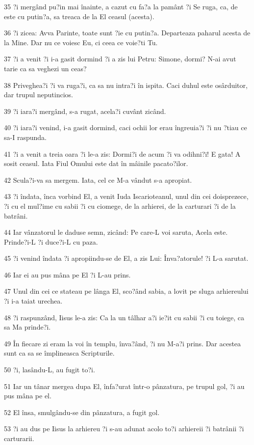 \par 35 ?i mergând pu?in mai înainte, a cazut cu fa?a la pamânt ?i Se ruga, ca, de este cu putin?a, sa treaca de la El ceasul (acesta).
\par 36 ?i zicea: Avva Parinte, toate sunt ?ie cu putin?a. Departeaza paharul acesta de la Mine. Dar nu ce voiesc Eu, ci ceea ce voie?ti Tu.
\par 37 ?i a venit ?i i-a gasit dormind ?i a zis lui Petru: Simone, dormi? N-ai avut tarie ca sa veghezi un ceas?
\par 38 Priveghea?i ?i va ruga?i, ca sa nu intra?i în ispita. Caci duhul este osârduitor, dar trupul neputincios.
\par 39 ?i iara?i mergând, s-a rugat, acela?i cuvânt zicând.
\par 40 ?i iara?i venind, i-a gasit dormind, caci ochii lor erau îngreuia?i ?i nu ?tiau ce sa-I raspunda.
\par 41 ?i a venit a treia oara ?i le-a zis: Dormi?i de acum ?i va odihni?i! E gata! A sosit ceasul. Iata Fiul Omului este dat în mâinile pacato?ilor.
\par 42 Scula?i-va sa mergem. Iata, cel ce M-a vândut s-a apropiat.
\par 43 ?i îndata, înca vorbind El, a venit Iuda Iscarioteanul, unul din cei doisprezece, ?i cu el mul?ime cu sabii ?i cu ciomege, de la arhierei, de la carturari ?i de la batrâni.
\par 44 Iar vânzatorul le daduse semn, zicând: Pe care-L voi saruta, Acela este. Prinde?i-L ?i duce?i-L cu paza.
\par 45 ?i venind îndata ?i apropiindu-se de El, a zis Lui: Înva?atorule! ?i L-a sarutat.
\par 46 Iar ei au pus mâna pe El ?i L-au prins.
\par 47 Unul din cei ce stateau pe lânga El, sco?ând sabia, a lovit pe sluga arhiereului ?i i-a taiat urechea.
\par 48 ?i raspunzând, Iisus le-a zis: Ca la un tâlhar a?i ie?it cu sabii ?i cu toiege, ca sa Ma prinde?i.
\par 49 În fiecare zi eram la voi în templu, înva?ând, ?i nu M-a?i prins. Dar acestea sunt ca sa se împlineasca Scripturile.
\par 50 ?i, lasându-L, au fugit to?i.
\par 51 Iar un tânar mergea dupa El, înfa?urat într-o pânzatura, pe trupul gol, ?i au pus mâna pe el.
\par 52 El însa, smulgându-se din pânzatura, a fugit gol.
\par 53 ?i au dus pe Iisus la arhiereu ?i s-au adunat acolo to?i arhiereii ?i batrânii ?i carturarii.

